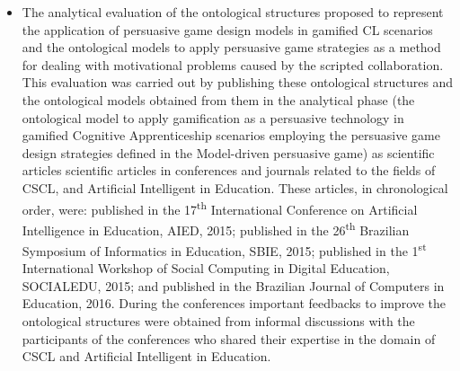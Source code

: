 \begin{description}
\begin{itemize}
\item
The analytical evaluation of the ontological structures proposed to represent the application of persuasive game design models in gamified CL scenarios and the ontological models to apply persuasive game strategies as a method for dealing with motivational problems caused by the scripted collaboration. This evaluation was carried out by publishing these ontological structures and the ontological models obtained from them in the analytical phase (the ontological model to apply gamification as a persuasive technology in gamified Cognitive Apprenticeship scenarios employing the persuasive game design strategies defined in the Model-driven persuasive game) as scientific articles scientific articles in conferences and journals related to the fields of CSCL, and Artificial Intelligent in Education. These articles, in chronological order, were:  published in the 17\textsuperscript{th} International Conference on Artificial Intelligence in Education, AIED, 2015;  published in the 26\textsuperscript{th} Brazilian Symposium of Informatics in Education, SBIE, 2015;  published in the 1\textsuperscript{st} International Workshop of Social Computing in Digital Education, SOCIALEDU, 2015; and  published in the Brazilian Journal of Computers in Education, 2016. During the conferences important feedbacks to improve the ontological structures were obtained from informal discussions with the participants of the conferences who shared their expertise in the domain of CSCL and Artificial Intelligent in Education.


\end{itemize}
\end{description}
